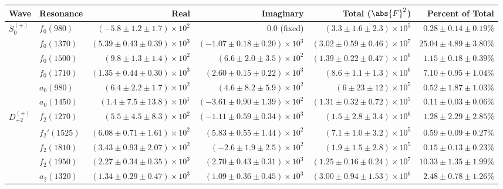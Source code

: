 \begin{table}[ht]
    \begin{center}
        \begin{tabular}{llrrrr}\toprule
        Wave & Resonance & Real & Imaginary & Total ($\abs{F}^2$) & Percent of Total \\\midrule
$S_{0}^{(+)}$ & $f_{0}(980)$ & $(-5.8 \pm 1.2 \pm 1.7) \times 10^{2}$ & $0.0$ (fixed) & $(3.3 \pm 1.6 \pm 2.3) \times 10^{5}$ & $0.28 \pm 0.14 \pm 0.19 \%$ \\
 & $f_{0}(1370)$ & $(5.39 \pm 0.43 \pm 0.39) \times 10^{3}$ & $(-1.07 \pm 0.18 \pm 0.20) \times 10^{3}$ & $(3.02 \pm 0.59 \pm 0.46) \times 10^{7}$ & $25.04 \pm 4.89 \pm 3.80 \%$ \\
 & $f_{0}(1500)$ & $(9.8 \pm 1.3 \pm 1.4) \times 10^{2}$ & $(6.6 \pm 2.0 \pm 3.5) \times 10^{2}$ & $(1.39 \pm 0.22 \pm 0.47) \times 10^{6}$ & $1.15 \pm 0.18 \pm 0.39 \%$ \\
 & $f_{0}(1710)$ & $(1.35 \pm 0.44 \pm 0.30) \times 10^{3}$ & $(2.60 \pm 0.15 \pm 0.22) \times 10^{3}$ & $(8.6 \pm 1.1 \pm 1.3) \times 10^{6}$ & $7.10 \pm 0.95 \pm 1.04 \%$ \\
 & $a_{0}(980)$ & $(6.4 \pm 2.2 \pm 1.7) \times 10^{2}$ & $(4.6 \pm 8.2 \pm 5.9) \times 10^{2}$ & $(6 \pm 23 \pm 12) \times 10^{5}$ & $0.52 \pm 1.87 \pm 1.03 \%$ \\
 & $a_{0}(1450)$ & $(1.4 \pm 7.5 \pm 13.8) \times 10^{1}$ & $(-3.61 \pm 0.90 \pm 1.39) \times 10^{2}$ & $(1.31 \pm 0.32 \pm 0.72) \times 10^{5}$ & $0.11 \pm 0.03 \pm 0.06 \%$ \\
$D_{+2}^{(+)}$ & $f_{2}(1270)$ & $(5.5 \pm 4.5 \pm 8.3) \times 10^{2}$ & $(-1.11 \pm 0.59 \pm 0.34) \times 10^{3}$ & $(1.5 \pm 2.8 \pm 3.4) \times 10^{6}$ & $1.28 \pm 2.29 \pm 2.85 \%$ \\
 & $f_{2}'(1525)$ & $(6.08 \pm 0.71 \pm 1.61) \times 10^{2}$ & $(5.83 \pm 0.55 \pm 1.44) \times 10^{2}$ & $(7.1 \pm 1.0 \pm 3.2) \times 10^{5}$ & $0.59 \pm 0.09 \pm 0.27 \%$ \\
 & $f_{2}(1810)$ & $(3.43 \pm 0.93 \pm 2.07) \times 10^{2}$ & $(-2.6 \pm 1.9 \pm 2.5) \times 10^{2}$ & $(1.9 \pm 1.5 \pm 2.8) \times 10^{5}$ & $0.15 \pm 0.13 \pm 0.23 \%$ \\
 & $f_{2}(1950)$ & $(2.27 \pm 0.34 \pm 0.35) \times 10^{3}$ & $(2.70 \pm 0.43 \pm 0.31) \times 10^{3}$ & $(1.25 \pm 0.16 \pm 0.24) \times 10^{7}$ & $10.33 \pm 1.35 \pm 1.99 \%$ \\
 & $a_{2}(1320)$ & $(1.34 \pm 0.29 \pm 0.47) \times 10^{3}$ & $(1.09 \pm 0.36 \pm 0.45) \times 10^{3}$ & $(3.00 \pm 0.94 \pm 1.53) \times 10^{6}$ & $2.48 \pm 0.78 \pm 1.26 \%$ \\

\end{tabular}
\end{center}
\end{table}

